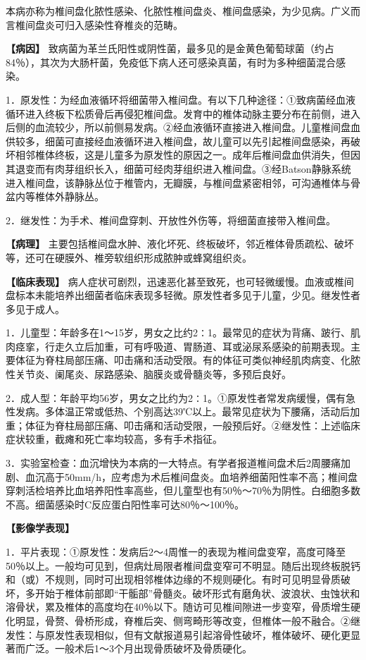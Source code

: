 本病亦称为椎间盘化脓性感染、化脓性椎间盘炎、椎间盘感染，为少见病。广义而言椎间盘炎可归入感染性脊椎炎的范畴。

\textbf{【病因】}
致病菌为革兰氏阳性或阴性菌，最多见的是金黄色葡萄球菌（约占84％），其次为大肠杆菌，免疫低下病人还可感染真菌，有时为多种细菌混合感染。

1．原发性：为经血液循环将细菌带入椎间盘。有以下几种途径：①致病菌经血液循环进入终板下松质骨后再侵犯椎间盘。发育中的椎体动脉主要分布在前侧，进入后侧的血流较少，所以前侧易发病。②经血液循环直接进入椎间盘。儿童椎间盘血供较多，细菌可直接经血液循环进入椎间盘，故儿童可以先引起椎间盘感染，再破坏相邻椎体终板，这是儿童多为原发性的原因之一。成年后椎间盘血供消失，但因其退变而有肉芽组织长入，细菌可经肉芽组织进入椎间盘。③经Batson静脉系统进入椎间盘，该静脉丛位于椎管内，无瓣膜，与椎间盘紧密相邻，可沟通椎体与骨盆内等椎体外静脉丛。

2．继发性：为手术、椎间盘穿刺、开放性外伤等，将细菌直接带入椎间盘。

\textbf{【病理】}
主要包括椎间盘水肿、液化坏死、终板破坏，邻近椎体骨质疏松、破坏等，还可在硬膜外、椎旁软组织形成脓肿或蜂窝组织炎。

\textbf{【临床表现】}
病人症状可剧烈，迅速恶化甚至致死，也可轻微缓慢。血液或椎间盘标本未能培养出细菌者临床表现多轻微。原发性者多见于儿童，少见。继发性者多见于成人。

1．儿童型：年龄多在1～15岁，男女之比约2∶1。最常见的症状为背痛、跛行、肌肉痉挛，行走久立后加重，可有呼吸道、胃肠道、耳或泌尿系感染的前期表现。主要体征为脊柱局部压痛、叩击痛和活动受限。有的体征可类似神经肌肉病变、化脓性关节炎、阑尾炎、尿路感染、脑膜炎或骨髓炎等，多预后良好。

2．成人型：年龄平均56岁，男女之比约为2∶1。①原发性者常发病缓慢，偶有急性发病。多体温正常或低热、个别高达39℃以上。最常见症状为下腰痛，活动后加重；体征为脊柱局部压痛、叩击痛和活动受限，一般预后好。②继发性：上述临床症状较重，截瘫和死亡率均较高，多有手术指征。

3．实验室检查：血沉增快为本病的一大特点。有学者报道椎间盘术后2周腰痛加剧、血沉高于50mm/h，应考虑为术后椎间盘炎。血培养细菌阳性率不高；椎间盘穿刺活检培养比血培养阳性率高些，但儿童型也有50％～70％为阴性。白细胞多数不高。细菌感染时C反应蛋白阳性率可达80％～100％。

\textbf{【影像学表现】}

1．平片表现：①原发性：发病后2～4周惟一的表现为椎间盘变窄，高度可降至50％以上。一般均可见到，但病灶局限者椎间盘变窄可不明显。随后出现终板脱钙和（或）不规则，同时可出现相邻椎体边缘的不规则硬化。有时可见明显骨质破坏，多开始于椎体前部即“干骺部”骨髓炎。破坏形式有磨角状、波浪状、虫蚀状和溶骨状，累及椎体的高度均在40％以下。随访可见椎间隙进一步变窄，骨质增生硬化明显，骨赘、骨桥形成，脊椎后突、侧弯畸形等改变，但椎体一般不融合。②继发性：与原发性表现相似，但有文献报道易引起溶骨性破坏，椎体破坏、硬化更显著而广泛。一般术后1～3个月出现骨质破坏及骨质硬化。

